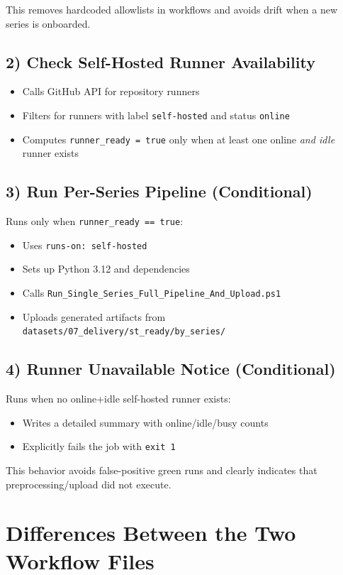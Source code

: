 \documentclass[11pt,a4paper]{article}
\begin{document}
This removes hardcoded allowlists in workflows and avoids drift when a new series is onboarded.

\subsection{2) Check Self-Hosted Runner Availability}
\begin{itemize}
  \item Calls GitHub API for repository runners
  \item Filters for runners with label \texttt{self-hosted} and status \texttt{online}
  \item Computes \texttt{runner\_ready = true} only when at least one online \emph{and idle} runner exists
\end{itemize}

\subsection{3) Run Per-Series Pipeline (Conditional)}
Runs only when \texttt{runner\_ready == true}:
\begin{itemize}
  \item Uses \texttt{runs-on: self-hosted}
  \item Sets up Python 3.12 and dependencies
  \item Calls \texttt{Run\_Single\_Series\_Full\_Pipeline\_And\_Upload.ps1}
  \item Uploads generated artifacts from \texttt{datasets/07\_delivery/st\_ready/by\_series/}
\end{itemize}

\subsection{4) Runner Unavailable Notice (Conditional)}
Runs when no online+idle self-hosted runner exists:
\begin{itemize}
  \item Writes a detailed summary with online/idle/busy counts
  \item Explicitly fails the job with \texttt{exit 1}
\end{itemize}
This behavior avoids false-positive green runs and clearly indicates that preprocessing/upload did not execute.

\section{Differences Between the Two Workflow Files}
\end{document}
